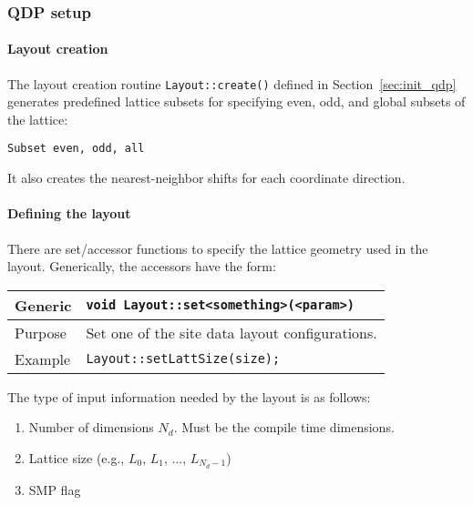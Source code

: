 \documentclass[12pt,letterpaper]{article}
\begin{document}
\subsubsection{QDP setup}

\paragraph{Layout creation}
\mbox{}

\noindent
The layout creation routine \verb|Layout::create()| defined in
Section~\ref{sec:init_qdp} generates predefined lattice subsets for
specifying even, odd, and global subsets of the lattice:
%
\begin{verbatim}
Subset even, odd, all
\end{verbatim}
%
It also creates the nearest-neighbor shifts for each coordinate
direction.

\paragraph{Defining the layout}
\mbox{}

\noindent
There are set/accessor functions to specify the lattice geometry used
in the layout. Generically, the accessors have the form:

\begin{flushleft}
  \begin{tabular}{|l|l|}
  \hline
  Generic      & \verb|void Layout::set<something>(<param>)|\\
  \hline
  Purpose      & Set one of the site data layout configurations. \\
\hline
  Example  & \verb|Layout::setLattSize(size);| \\
   \hline
 \end{tabular}
\end{flushleft}

The type of input information needed by the layout is as follows:
\begin{enumerate}
\item	Number of dimensions $N_d$. Must be the compile time dimensions.
\item	Lattice size  (e.g., $L_0$, $L_1$, ..., $L_{N_d-1}$)
\item	SMP flag
\end{enumerate}
\end{document}
